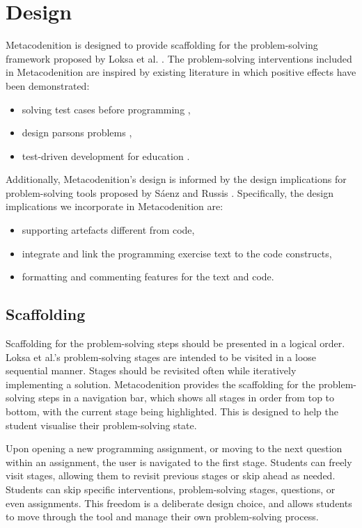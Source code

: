\documentclass[sigconf,anonymous]{acmart}
\begin{document}
\section{Design} \label{sec:design}
Metacodenition is designed to provide scaffolding 
for the problem-solving framework proposed by Loksa et al. \cite{loksa20162}. The problem-solving interventions included in Metacodenition are inspired by existing literature in which positive effects have been demonstrated:
\begin{itemize}
\item solving test cases before programming \cite{craig2019, denny2019, prather2019},
\item design parsons problems \cite{garcia2021},
\item test-driven development for education \cite{janzen2008}.
\end{itemize}
Additionally, Metacodenition's design is informed by the design implications for problem-solving tools proposed by Sáenz and Russis \cite{saenz2022}. Specifically, the design implications we incorporate in Metacodenition are:
\begin{itemize}
\item supporting artefacts different from code,
\item integrate and link the programming exercise text to the code constructs,
\item formatting and commenting features for the text and code.
\end{itemize}

\subsection{Scaffolding} \label{sec:design-scaffolding}
Scaffolding for the problem-solving steps should be presented in a logical order. Loksa et al.'s problem-solving stages are intended to be visited in a loose sequential manner. Stages should be revisited often while iteratively implementing a solution. Metacodenition provides the scaffolding for the problem-solving steps in a navigation bar, which shows all stages in order from top to bottom, with the current stage being highlighted. This is designed to help the student visualise their problem-solving state. 

Upon opening a new programming assignment, or moving to the next question within an assignment, the user is navigated to the first stage. Students can freely visit stages, allowing them to revisit previous stages or skip ahead as needed.
Students can skip specific interventions, problem-solving stages, questions, or even assignments. 
This freedom is a deliberate design choice, and allows students to move through the tool and manage their own problem-solving process.
\end{document}
